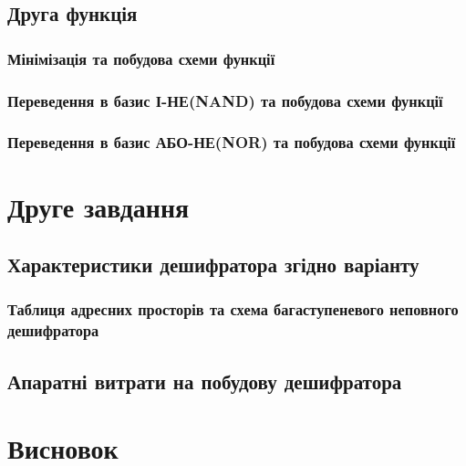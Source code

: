 \newpage
%
\section{Друга функція}

\newpage
\subsection{Мінімізація та побудова схеми функції}

\newpage
%
\subsection{Переведення в базис І-НЕ(NAND) та побудова схеми функції}

\newpage
%
\subsection{Переведення в базис АБО-НЕ(NOR) та побудова схеми функції}

\newpage
%
\chapter{Друге завдання}
\section{Характеристики дешифратора згідно варіанту}

\newpage
\subsection{Таблиця адресних просторів та схема багаступеневого неповного дешифратора}

\newpage
%
\section{Апаратні витрати на побудову дешифратора}

\newpage
\chapter{Висновок}
